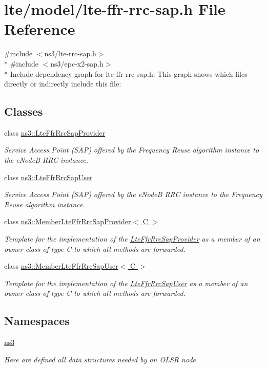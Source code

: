 \hypertarget{lte-ffr-rrc-sap_8h}{}\section{lte/model/lte-\/ffr-\/rrc-\/sap.h File Reference}
\label{lte-ffr-rrc-sap_8h}
{\ttfamily \#include $<$ns3/lte-\/rrc-\/sap.\+h$>$}\\*
{\ttfamily \#include $<$ns3/epc-\/x2-\/sap.\+h$>$}\\*
Include dependency graph for lte-\/ffr-\/rrc-\/sap.h\+:
This graph shows which files directly or indirectly include this file\+:
\subsection*{Classes}
\begin{DoxyCompactItemize}
\item 
class \hyperlink{classns3_1_1LteFfrRrcSapProvider}{ns3\+::\+Lte\+Ffr\+Rrc\+Sap\+Provider}
\begin{DoxyCompactList}\small\item\em Service Access Point (S\+AP) offered by the Frequency Reuse algorithm instance to the e\+NodeB R\+RC instance. \end{DoxyCompactList}\item 
class \hyperlink{classns3_1_1LteFfrRrcSapUser}{ns3\+::\+Lte\+Ffr\+Rrc\+Sap\+User}
\begin{DoxyCompactList}\small\item\em Service Access Point (S\+AP) offered by the e\+NodeB R\+RC instance to the Frequency Reuse algorithm instance. \end{DoxyCompactList}\item 
class \hyperlink{classns3_1_1MemberLteFfrRrcSapProvider}{ns3\+::\+Member\+Lte\+Ffr\+Rrc\+Sap\+Provider$<$ C $>$}
\begin{DoxyCompactList}\small\item\em Template for the implementation of the \hyperlink{classns3_1_1LteFfrRrcSapProvider}{Lte\+Ffr\+Rrc\+Sap\+Provider} as a member of an owner class of type C to which all methods are forwarded. \end{DoxyCompactList}\item 
class \hyperlink{classns3_1_1MemberLteFfrRrcSapUser}{ns3\+::\+Member\+Lte\+Ffr\+Rrc\+Sap\+User$<$ C $>$}
\begin{DoxyCompactList}\small\item\em Template for the implementation of the \hyperlink{classns3_1_1LteFfrRrcSapUser}{Lte\+Ffr\+Rrc\+Sap\+User} as a member of an owner class of type C to which all methods are forwarded. \end{DoxyCompactList}\end{DoxyCompactItemize}
\subsection*{Namespaces}
\begin{DoxyCompactItemize}
\item 
 \hyperlink{namespacens3}{ns3}
\begin{DoxyCompactList}\small\item\em Here are defined all data structures needed by an O\+L\+SR node. \end{DoxyCompactList}\end{DoxyCompactItemize}
